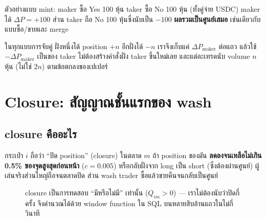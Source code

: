 \documentclass[11pt,a4paper]{article}
\begin{document}
ตัวอย่างแบบ mint: maker ซื้อ Yes 100 หุ้น taker ซื้อ No 100 หุ้น (ทั้งคู่จ่าย USDC)
maker ได้ $\Delta P = +100$ ส่วน taker ถือ No 100 หุ้นซึ่งนับเป็น $-100$
\textbf{ผลรวมเป็นศูนย์เสมอ} เช่นเดียวกับแบบซื้อ/ขายและ merge

\begin{keybox}[title={ข้อสังเกตที่ทำให้ไปป์ไลน์ง่ายลงครึ่งหนึ่ง}]
ในทุกแบบการจับคู่ ฝั่งหนึ่งได้ position $+n$ อีกฝั่งได้ $-n$
เราจึงเก็บแค่ $\Delta P_{\text{maker}}$ ต่อแถว แล้วใช้ $-\Delta P_{\text{maker}}$ เป็นของ taker
ไม่ต้องสร้างคำสั่งฝั่ง taker ขึ้นใหม่เลย และแต่ละเทรดนับ volume $n$ หุ้น
(ไม่ใช่ $2n$) ตามข้อตกลงของเปเปอร์
\end{keybox}

\section{Closure: สัญญาณชั้นแรกของ wash}
\label{sec:closure}

\subsection{closure คืออะไร}

กระเป๋า $i$ ถือว่า ``ปิด position'' (closure) ในตลาด $m$ ถ้า position ของมัน
\textbf{ลดลงจนเหลือไม่เกิน 0.5\% ของจุดสูงสุดก่อนหน้า} ($c = 0.005$)
หรือกลับฝั่งจาก long เป็น short (ซึ่งต้องผ่านศูนย์)
ผู้เล่นจริงส่วนใหญ่ถือจนตลาดปิด ส่วน wash trader ซื้อแล้วขายคืนจนกลับเป็นศูนย์

\begin{figure}[H]
\centering
{}
\caption{closure เป็นการทดสอบ ``มีหรือไม่มี'' เท่านั้น ($Q_{im} > 0$) --- เราไม่ต้องนับว่าปิดกี่ครั้ง
จึงคำนวณได้ด้วย window function ใน SQL บนหลายสิบล้านแถวในไม่กี่วินาที}
\end{figure}
\end{document}
